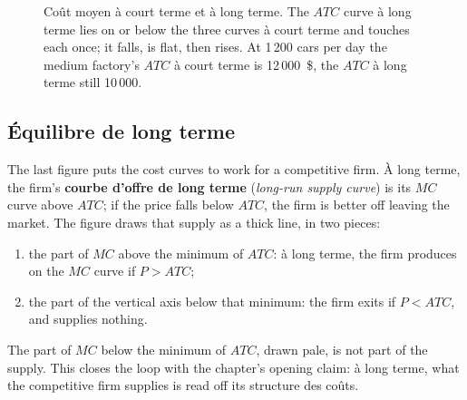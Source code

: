 \begin{figure}[h!]
  \caption*{\small Coût moyen à court terme et à long terme. The $ATC$ curve à long
  terme lies on or below the three curves à court terme and touches each once; it
  falls, is flat, then rises. At 1\,200 cars per day the medium factory's
  $ATC$ à court terme is 12\,000~\$, the $ATC$ à long terme still 10\,000.}
\end{figure}

\subsection{Équilibre de long terme}

The last figure puts the cost curves to work for a competitive firm. À long terme,
the firm's \textbf{courbe d'offre de long terme} (\textit{long-run supply curve})
is its $MC$ curve above $ATC$; if the price falls below $ATC$, the firm is better
off leaving the market. The figure draws that supply as a thick line, in two
pieces:
\begin{enumerate}
  \item the part of $MC$ above the minimum of $ATC$: à long terme, the firm
    produces on the $MC$ curve if $P > ATC$;
  \item the part of the vertical axis below that minimum: the firm exits if
    $P < ATC$, and supplies nothing.
\end{enumerate}
The part of $MC$ below the minimum of $ATC$, drawn pale, is not part of the supply.
This closes the loop with the chapter's opening claim: à long terme, what the
competitive firm supplies is read off its structure des coûts.


